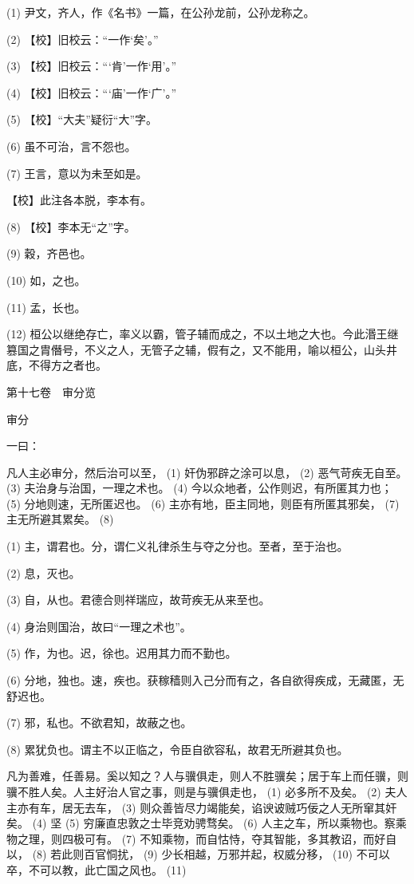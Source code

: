 \documentclass[12pt,UTF8]{ctexbook}
\begin{document}
(1) 尹文，齐人，作《名书》一篇，在公孙龙前，公孙龙称之。

(2) 【校】旧校云：“一作‘矣’。”

(3) 【校】旧校云：“‘肯’一作‘用’。”

(4) 【校】旧校云：“‘庙’一作‘广’。”

(5) 【校】“大夫”疑衍“大”字。

(6) 虽不可治，言不怨也。

(7) 王言，意以为未至如是。

【校】此注各本脱，李本有。

(8) 【校】李本无“之”字。

(9) 穀，齐邑也。

(10) 如，之也。

(11) 孟，长也。

(12) 桓公以继绝存亡，率义以霸，管子辅而成之，不以土地之大也。今此湣王继篡国之胄僭号，不义之人，无管子之辅，假有之，又不能用，喻以桓公，山头井底，不得方之者也。





第十七卷　审分览



审分


一曰：

凡人主必审分，然后治可以至， (1) 奸伪邪辟之涂可以息， (2) 恶气苛疾无自至。 (3) 夫治身与治国，一理之术也。 (4) 今以众地者，公作则迟，有所匿其力也； (5) 分地则速，无所匿迟也。 (6) 主亦有地，臣主同地，则臣有所匿其邪矣， (7) 主无所避其累矣。 (8)

(1) 主，谓君也。分，谓仁义礼律杀生与夺之分也。至者，至于治也。

(2) 息，灭也。

(3) 自，从也。君德合则祥瑞应，故苛疾无从来至也。

(4) 身治则国治，故曰“一理之术也”。

(5) 作，为也。迟，徐也。迟用其力而不勤也。

(6) 分地，独也。速，疾也。获稼穑则入己分而有之，各自欲得疾成，无藏匿，无舒迟也。

(7) 邪，私也。不欲君知，故蔽之也。

(8) 累犹负也。谓主不以正临之，令臣自欲容私，故君无所避其负也。

凡为善难，任善易。奚以知之？人与骥俱走，则人不胜骥矣；居于车上而任骥，则骥不胜人矣。人主好治人官之事，则是与骥俱走也， (1) 必多所不及矣。 (2) 夫人主亦有车，居无去车， (3) 则众善皆尽力竭能矣，谄谀诐贼巧佞之人无所窜其奸矣。 (4) 坚 (5) 穷廉直忠敦之士毕竞劝骋骛矣。 (6) 人主之车，所以乘物也。察乘物之理，则四极可有。 (7) 不知乘物，而自怙恃，夺其智能，多其教诏，而好自以， (8) 若此则百官恫扰， (9) 少长相越，万邪并起，权威分移， (10) 不可以卒，不可以教，此亡国之风也。 (11)
\end{document}
